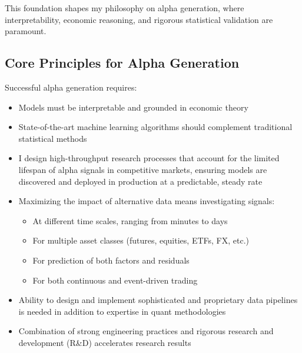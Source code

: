 \documentclass[11pt, letterpaper]{article}
\begin{document}
  This foundation shapes my philosophy on alpha generation, where interpretability,
  economic reasoning, and rigorous statistical validation are paramount.

  \subsection{Core Principles for Alpha Generation}
  \label{core-principles-for-alpha-generation}

  Successful alpha generation requires:

  \begin{itemize}
    \item Models must be interpretable and grounded in economic theory

    \item State-of-the-art machine learning algorithms should complement
      traditional statistical methods

    \item I design high-throughput research processes that account for the
      limited lifespan of alpha signals in competitive markets, ensuring
      models are discovered and deployed in production at a predictable,
      steady rate

    \item Maximizing the impact of alternative data means investigating signals:

      \begin{itemize}
        \item At different time scales, ranging from minutes to days

        \item For multiple asset classes (futures, equities, ETFs, FX,
          etc.)

        \item For prediction of both factors and residuals

        \item For both continuous and event-driven trading
      \end{itemize}

    \item Ability to design and implement sophisticated and proprietary data
      pipelines is needed in addition to expertise in quant methodologies

    \item Combination of strong engineering practices and rigorous research
      and development (R\&D) accelerates research results
  \end{itemize}
\end{document}
